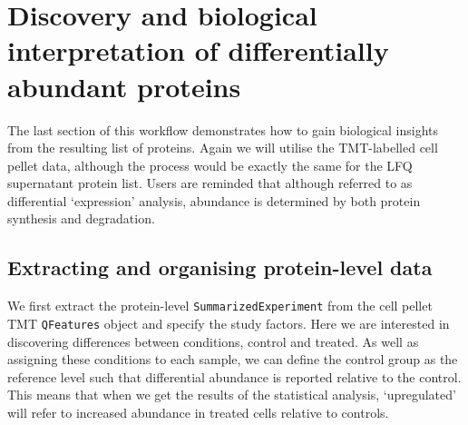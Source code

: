 \documentclass[9pt,a4paper,]{extarticle}
\newenvironment{Shaded}{\begin{snugshade}}{\end{snugshade}}
\newcommand{\DocumentationTok}[1]{\textcolor[rgb]{0.56,0.35,0.01}{\textbf{\textit{#1}}}}
\newcommand{\FunctionTok}[1]{\textcolor[rgb]{0.13,0.29,0.53}{\textbf{#1}}}
\newcommand{\NormalTok}[1]{#1}
\newcommand{\OtherTok}[1]{\textcolor[rgb]{0.56,0.35,0.01}{#1}}
\newcommand{\SpecialCharTok}[1]{\textcolor[rgb]{0.81,0.36,0.00}{\textbf{#1}}}
\newcommand{\StringTok}[1]{\textcolor[rgb]{0.31,0.60,0.02}{#1}}
\begin{document}
\section{Discovery and biological interpretation of differentially abundant proteins}\label{discovery-and-biological-interpretation-of-differentially-abundant-proteins}

The last section of this workflow demonstrates how to gain biological insights
from the resulting list of proteins. Again we will utilise the TMT-labelled cell
pellet data, although the process would be exactly the same for the LFQ
supernatant protein list. Users are reminded that although referred to as
differential `expression' analysis, abundance is determined by both protein
synthesis and degradation.

\subsection{Extracting and organising protein-level data}\label{extracting-and-organising-protein-level-data}

We first extract the protein-level \texttt{SummarizedExperiment} from the cell pellet
TMT \texttt{QFeatures} object and specify the study factors. Here we are interested in
discovering differences between conditions, control and treated. As well as
assigning these conditions to each sample, we can define the control group as the
reference level such that differential abundance is reported relative to the
control. This means that when we get the results of the statistical analysis,
`upregulated' will refer to increased abundance in treated cells relative to
controls.

\begin{Shaded}
\end{Shaded}
\end{document}
